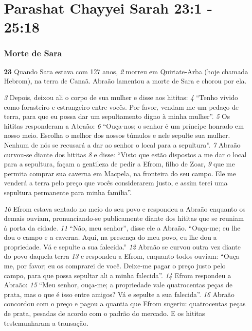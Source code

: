 \section*{Parashat Chayyei Sarah 23:1 - 25:18}

\subsubsection*{Morte de Sara}

\textbf{\large 23}
 Quando Sara estava com 127 anos, 
\textit{\tiny 2}
morreu em Quiriate-Arba (hoje
chamada Hebrom), na terra de Canaã. Abraão lamentou a morte de Sara e chorou
por ela.

\bigskip
\textit{\tiny 3}
Depois, deixou ali o corpo de sua mulher e disse aos hititas: 
\textit{\tiny 4}
“Tenho vivido
como forasteiro e estrangeiro entre vocês. Por favor, vendam-me um pedaço de
terra, para que eu possa dar um sepultamento digno à minha mulher”.
\textit{\tiny 5}
Os hititas responderam a Abraão: 
\textit{\tiny 6}
“Ouça-nos; o senhor é um príncipe
honrado em nosso meio. Escolha o melhor dos nossos túmulos e nele sepulte sua
mulher. Nenhum de nós se recusará a dar ao senhor o local para a sepultura”.
\textit{\tiny 7}
Abraão curvou-se diante dos hititas 
\textit{\tiny 8}
e disse: “Visto que estão dispostos a me
dar o local para a sepultura, façam a gentileza de pedir a Efrom, filho de Zoar,
\textit{\tiny 9}
que me permita comprar sua caverna em Macpela, na fronteira do seu campo.
Ele me venderá a terra pelo preço que vocês considerarem justo, e assim terei uma
sepultura permanente para minha família”.

\bigskip
\textit{\tiny 10}
Efrom estava sentado no meio do seu povo e respondeu a Abraão enquanto
os demais ouviam, pronunciando-se publicamente diante dos hititas que se
reuniam à porta da cidade. 
\textit{\tiny 11}
“Não, meu senhor”, disse ele a Abraão. “Ouça-me; eu
lhe dou o campo e a caverna. Aqui, na presença do meu povo, eu lhe dou a
propriedade. Vá e sepulte a sua falecida.”
\textit{\tiny 12}
Abraão se curvou outra vez diante do povo daquela terra 
\textit{\tiny 13}
e respondeu a
Efrom, enquanto todos ouviam: “Ouça-me, por favor; eu os comprarei de você.
Deixe-me pagar o preço justo pelo campo, para que possa sepultar ali a minha
falecida”.
\textit{\tiny 14}
Efrom respondeu a Abraão: 
\textit{\tiny 15}
“Meu senhor, ouça-me; a propriedade vale
quatrocentas peças de prata, mas o que é isso entre amigos? Vá e sepulte a sua
falecida”.
\textit{\tiny 16}
Abraão concordou com o preço e pagou a quantia que Efrom sugeriu:
quatrocentas peças de prata, pesadas de acordo com o padrão do mercado. E os
hititas testemunharam a transação.

